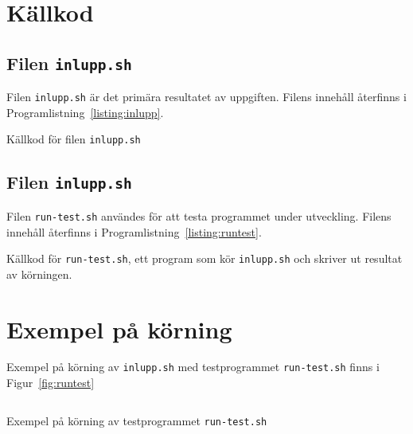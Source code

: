 %
%
%


\section{Källkod}

\subsection{Filen \texttt{inlupp.sh}}
Filen \texttt{inlupp.sh} är det primära resultatet av uppgiften.  
Filens innehåll återfinns i Programlistning~\ref{listing:inlupp}.


\begin{listing}[H]
\caption{Källkod för filen \texttt{inlupp.sh}}
\label{listing:inlupp}
\end{listing}


\subsection{Filen \texttt{inlupp.sh}}
Filen \texttt{run-test.sh} användes för att testa programmet under utveckling.
Filens innehåll återfinns i Programlistning~\ref{listing:runtest}.

\begin{listing}[H]
\caption{Källkod för \texttt{run-test.sh}, ett program som kör
         \texttt{inlupp.sh} och skriver ut resultat av körningen.}
\label{listing:runtest}
\end{listing}


\section{Exempel på körning}
Exempel på körning av \texttt{inlupp.sh} med testprogrammet \texttt{run-test.sh}
finns i Figur~\ref{fig:runtest}

\begin{listing}[H]
\inputminted[]{shell}{../test/run-test_output}
\caption{Exempel på körning av testprogrammet \texttt{run-test.sh}}
\label{listing:gitclone}
\end{listing}
